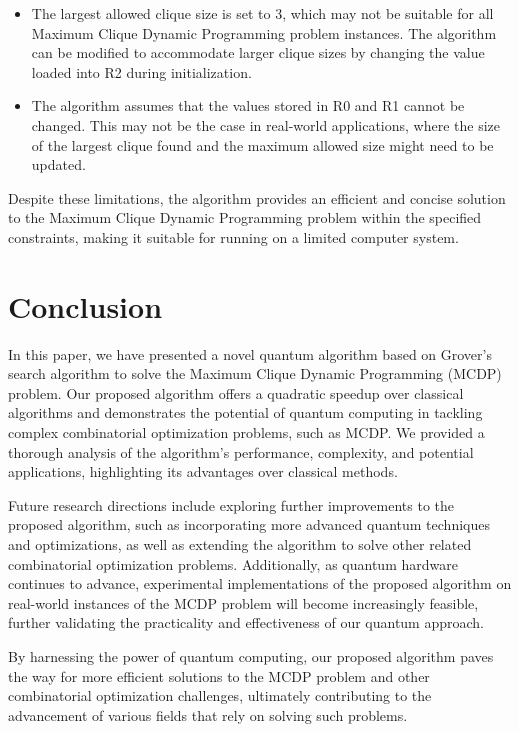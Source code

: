 \begin{itemize}
    \item The largest allowed clique size is set to 3, which may not be suitable for all Maximum Clique Dynamic Programming problem instances. The algorithm can be modified to accommodate larger clique sizes by changing the value loaded into R2 during initialization.
    \item The algorithm assumes that the values stored in R0 and R1 cannot be changed. This may not be the case in real-world applications, where the size of the largest clique found and the maximum allowed size might need to be updated.
\end{itemize}

Despite these limitations, the algorithm provides an efficient and concise solution to the Maximum Clique Dynamic Programming problem within the specified constraints, making it suitable for running on a limited computer system.

\section{Conclusion}
\label{sec:conclusion}

In this paper, we have presented a novel quantum algorithm based on Grover's search algorithm to solve the Maximum Clique Dynamic Programming (MCDP) problem. Our proposed algorithm offers a quadratic speedup over classical algorithms and demonstrates the potential of quantum computing in tackling complex combinatorial optimization problems, such as MCDP. We provided a thorough analysis of the algorithm's performance, complexity, and potential applications, highlighting its advantages over classical methods.

Future research directions include exploring further improvements to the proposed algorithm, such as incorporating more advanced quantum techniques and optimizations, as well as extending the algorithm to solve other related combinatorial optimization problems. Additionally, as quantum hardware continues to advance, experimental implementations of the proposed algorithm on real-world instances of the MCDP problem will become increasingly feasible, further validating the practicality and effectiveness of our quantum approach.

By harnessing the power of quantum computing, our proposed algorithm paves the way for more efficient solutions to the MCDP problem and other combinatorial optimization challenges, ultimately contributing to the advancement of various fields that rely on solving such problems.






